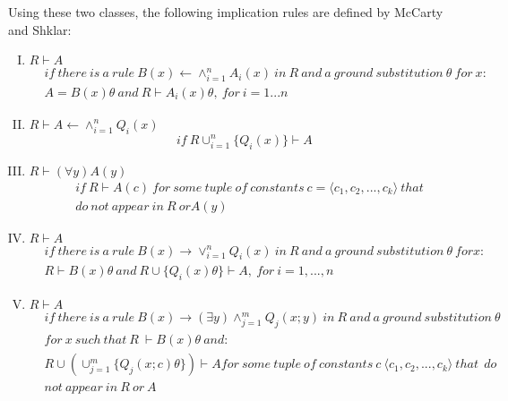 Using these two classes, the following implication rules are defined by McCarty
and Shklar:
\begin{enumerate}[I)]
  \item $R \vdash A$
    \begin{equation}
      \begin{split}
        &if\ there\ is\ a\ rule\ B(x) \leftarrow \wedge^{n}_{i=1} A_i(x)\ in\ R\ and\ a\ ground\ substitution\ \theta\ for\ x:\\
        &A=B(x)\theta\ and\ R \vdash A_i(x)\theta,\ for\ i = 1...n
      \end{split}
    \end{equation}

    \item $R \vdash A \leftarrow \wedge^{n}_{i=1} Q_i(x)$
      \begin{equation}
        if\ R \cup^n_{i=1}\{Q_i(x)\} \vdash A
      \end{equation}

    \item $R \vdash (\forall y) A(y)$
      \begin{equation}
      \begin{split}
        &if\ R \vdash A(c)\ for\ some\ tuple\ of\ constants\ c=\langle c_1,c_2,...,c_k\rangle\ that\\
        &do\ not\ appear\ in\ R\ or A(y)
      \end{split}
    \end{equation}

    \item $R \vdash A$
      \begin{equation}
      \begin{split}
        &if\ there\ is\ a\ rule\ B(x) \rightarrow \vee^n_{i=1}Q_i(x)\ in\ R\ and\ a\ ground\ substitution\ \theta\ for x:\\
        &R \vdash B(x)\theta\ and\ R \cup \{Q_i(x)\theta\}\vdash A,\ for\ i=1,...,n
      \end{split}
    \end{equation}

    \item $R \vdash A$
      \begin{equation}
      \begin{split}
        &if\ there\ is\ a\ rule\ B(x) \rightarrow (\exists y)\wedge^m_{j=1}Q_j(x;y)\ in\ R\ and\ a\ ground\ substitution\ \theta\ \\
        &for\ x\ such\ that\ R\ \vdash B(x)\theta\ and:\\
        &R \cup (\cup^m_{j=1}\{Q_j(x;c)\theta\})\vdash A for\ some\ tuple\ of\ constants\ c\ \langle c_1,c_2,...,c_k \rangle\ that\ \ do\\
        &not\ appear\ in\ R\ or\ A
      \end{split}
    \end{equation}
\end{enumerate}

